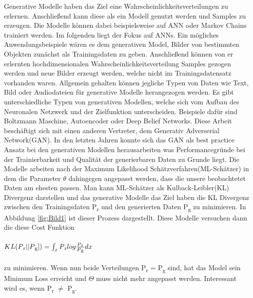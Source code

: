 \documentclass{llncs}
\begin{document}
Generative Modelle haben das Ziel eine Wahrscheinlichkeitsverteilungen zu erlernen. Anschließend kann diese als ein Modell genutzt werden und Samples zu erzeugen. Die Modelle können dabei beispielsweise auf ANN oder Markov Chains trainiert werden\cite{Grundlagen}. Im folgenden liegt der Fokus auf ANNs. Ein mögliches Anwendungsbeispiele wären es dem generativen Model, Bilder von bestimmten Objekten zunächst als Trainingsdaten zu geben. Anschließend können von er erlernten hochdimensionalen Wahrscheinlichkeitsverteilung Samples gezogen werden und neue Bilder erzeugt werden, welche nicht im Trainingsdatensatz vorhanden waren. Allgemein gehalten können jegliche Typen von Daten wie Text, Bild oder Audiodateien für generative Modelle herangezogen werden. Es gibt unterschiedliche Typen von generativen Modellen, welche sich vom Aufbau des Neuronalen Netzwerk und der Zielfunktion unterscheiden. Beispiele dafür sind Boltzmann Maschine, Autoencoder oder Deep Belief Networks\cite{Grundlagen}. Diese Arbeit beschäftigt sich mit einen anderen Vertreter, dem Generativ Adverserial Network(GAN). In den letzten Jahren konnte sich das GAN als best practice Ansatz bei den generativen Modellen herausarbeiten was Performancegründe bei der Trainierbarkeit und Qualität der generierbaren Daten zu Grunde liegt\cite{Grundlagen}. 
Die Modelle arbeiten nach der Maximum Likelihood Schätzverfahren(ML-Schätzer) in dem die Parameter $\theta$ dahingegen angepasst werden, dass die unsere beobachtetet Daten am ehesten passen. Man kann ML-Schätzer als Kulback-Leibler(KL) Divergenz darstellen und das generative Modelle das Ziel haben die KL Divergenz zwischen den Trainingsdaten P\textsubscript{r} und den generierten Daten P\textsubscript{g} zu minimieren. In Abbildung \ref{fig:Bild1} ist dieser Prozess dargestellt. Diese Modelle versuchen dann die diese Cost Funktion  
\\
\\
\begin{math}
KL(P\textsubscript{r}|| P\textsubscript{g}])=\int_x P\textsubscript{r}log\frac{P\textsubscript{r}}{P\textsubscript{g}}dx                     
\end{math}
\\
\\
zu minimieren. Wenn nun beide Verteilungen P\textsubscript{r} = P\textsubscript{g} sind, hat das Model sein Minimum Loss erreicht und $\Theta$ muss nicht mehr angepasst werden. Interessant wird es, wenn P\textsubscript{r} $\ne$ P\textsubscript{g}.
\end{document}
